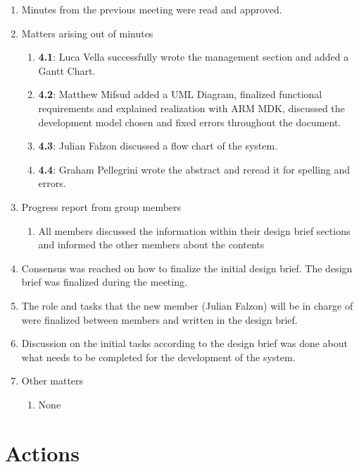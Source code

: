 \documentclass{cce2014-meetings}
\begin{document}
\begin{enumerate}

\item Minutes from the previous meeting were read and approved.

\item Matters arising out of minutes
   \begin{enumerate}
   \item \textbf{4.1}: Luca Vella successfully wrote the management section and added a Gantt Chart.
   \item \textbf{4.2}: Matthew Mifsud added a UML Diagram, finalized functional requirements and explained realization with ARM MDK, discussed the development model chosen and fixed errors throughout the document.
   \item \textbf{4.3}: Julian Falzon discussed a flow chart of the system.
   \item \textbf{4.4}: Graham Pellegrini wrote the abstract and reread it for spelling and errors.
   \end{enumerate}

\item Progress report from group members
   \begin{enumerate}
   \item All members discussed the information within their design brief sections and informed the other members about the contents
   \end{enumerate}

\item Consensus was reached on how to finalize the initial design brief. The design brief was finalized during the meeting.

\item The role and tasks that the new member (Julian Falzon) will be in charge of were finalized between members and written in the design brief.

\item Discussion on the initial tasks according to the design brief was done about what needs to be completed for the development of the system.

\item Other matters
   \begin{enumerate}
   \item None
   \end{enumerate}

\end{enumerate}

\section*{Actions}
\end{document}
